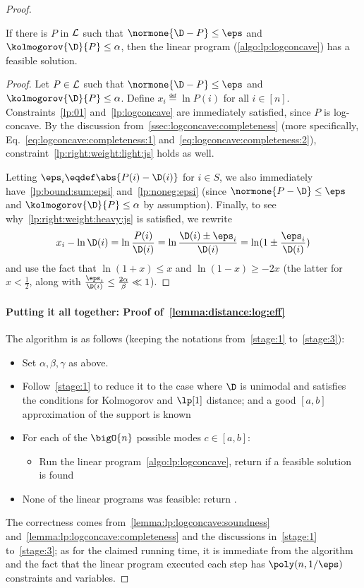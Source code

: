 \begin{proof}
\begin{lemma}[Completeness]\label{lemma:lp:logconcave:completeness}
If there is $P$ in $\mathcal{L}$ such that $\normone{\D-P}\leq \eps$ and $\kolmogorov{\D}{P}\leq \alpha$, then the linear program (\cref{algo:lp:logconcave}) has a feasible solution.
\end{lemma}
\begin{proof}
 Let $P\in\mathcal{L}$ such that $\normone{\D - P}\leq \eps$ and $\kolmogorov{\D}{P}\leq \alpha$.
 Define $x_i\eqdef \ln P(i)$ for all $i\in[n]$. Constraints~\eqref{lp:01} and~\eqref{lp:logconcave} are immediately satisfied, since $P$ is log-concave. By the discussion from~\cref{ssec:logconcave:completeness} (more specifically, Eq.~\eqref{eq:logconcave:completeness:1} and~\eqref{eq:logconcave:completeness:2}), constraint~\eqref{lp:right:weight:light:js} holds as well.
 
 Letting $\eps_i\eqdef \abs{P(i)-\D(i)}$ for $i\in S$, we also immediately have~\eqref{lp:bound:sum:epsi} and~\eqref{lp:noneg:epsi} (since $\normone{P-\D} \leq \eps$ and $\kolmogorov{\D}{P}\leq \alpha$ by assumption). Finally, to see why~\eqref{lp:right:weight:heavy:js} is satisfied, we rewrite
 \[
      x_i - \ln\D(i) = \ln\frac{P(i)}{\D(i)} =  \ln\frac{\D(i)\pm\eps_i}{\D(i)} = \ln(1\pm \frac{\eps_i}{\D(i)})
 \] 
 and use the fact that $\ln(1+x) \leq x$ and $\ln(1-x) \geq -2x$ (the latter for $x < \frac{1}{2}$, along with $\frac{\eps_i}{\D(i)} \leq \frac{2\alpha}{\beta} \ll 1$).
\end{proof}

\paragraph{Putting it all together: Proof of~\cref{lemma:distance:log:eff}}

The algorithm is as follows (keeping the notations from~\cref{stage:1} to~\cref{stage:3}):
\begin{itemize}
  \item Set $\alpha,\beta,\gamma$ as above.
  \item Follow~\cref{stage:1} to reduce it to the case where $\D$ is unimodal and satisfies the conditions for Kolmogorov and $\lp[1]$ distance; and a good $[a,b]$ approximation of the support is known
  \item For each of the $\bigO{n}$ possible modes $c\in[a,b]$:
  \begin{itemize}
    \item Run the linear program~\cref{algo:lp:logconcave}, return \accept if a feasible solution is found
  \end{itemize}
  \item None of the linear programs was feasible: return \reject.
\end{itemize}

The correctness comes from~\cref{lemma:lp:logconcave:soundness} and~\cref{lemma:lp:logconcave:completeness} and the discussions in~\cref{stage:1} to~\cref{stage:3}; as for the claimed running time, it is immediate from the algorithm and the fact that the linear program executed each step has $\poly(n,1/\eps)$ constraints and variables.

\end{proof}
